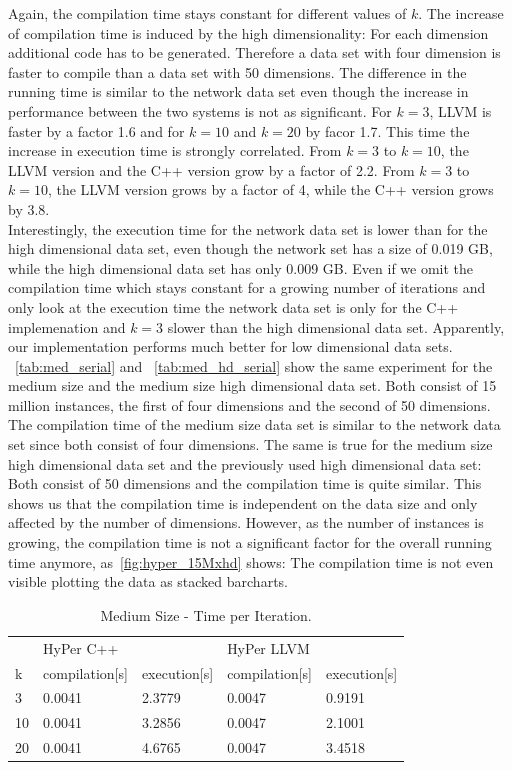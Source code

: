 Again, the compilation time stays constant for different values of $k$. The increase of compilation time is induced by the high dimensionality: For each dimension additional code has to be generated. Therefore a data set with four dimension is faster to compile than a data set with 50 dimensions. 
The difference in the running time is similar to the network data set even though the increase in performance between the two systems is not as significant. For $k = 3$, LLVM is faster by a factor 1.6 and for $k = 10$ and $k = 20$ by facor 1.7. This time the increase in execution time is strongly correlated. From $k = 3$ to $k = 10$, the LLVM version and the C++ version grow by a factor of 2.2. From $k = 3$ to $k = 10$, the LLVM version grows by a factor of 4, while the C++ version grows by 3.8.
\\
Interestingly, the execution time for the network data set is lower than for the high dimensional data set, even though the network set has a size of 0.019 GB, while the high dimensional data set has only 0.009 GB. Even if we omit the compilation time which stays constant for a growing number of iterations and only look at the execution time the network data set is only for the C++ implemenation and $k = 3$ slower than the high dimensional data set. Apparently, our implementation performs much better for low dimensional data sets.
\\
~\autoref{tab:med_serial} and ~\autoref{tab:med_hd_serial} show the same experiment for the medium size and the medium size high dimensional data set. Both consist of 15 million instances, the first of four dimensions and the second of 50 dimensions. The compilation time of the medium size data set is similar to the network data set since both consist of four dimensions. The same is true for the medium size high dimensional data set and the previously used high dimensional data set: Both consist of 50 dimensions and the compilation time is quite similar. This shows us that the compilation time is independent on the data size and only affected by the number of dimensions. However, as the number of instances is growing, the compilation time is not a significant factor for the overall running time anymore, as~\autoref{fig:hyper_15Mxhd} shows: The compilation time is not even visible plotting the data as stacked barcharts.

\begin{table}[htsb]
  \caption[Medium Size - Time per Iteration]{Medium Size - Time per Iteration.}
  \label{tab:med_serial}
  \centering
  \begin{tabular}{l l l l l}
    \toprule
      & HyPer C++ & & HyPer LLVM & \\
      k & compilation[s] & execution[s] & compilation[s] & execution[s] \\
    \midrule
      3  & 0.0041 & 2.3779 & 0.0047 & 0.9191 \\
      10 & 0.0041 & 3.2856 & 0.0047 & 2.1001 \\
      20 & 0.0041 & 4.6765 & 0.0047 & 3.4518 \\
    \bottomrule
  \end{tabular}
\end{table}


